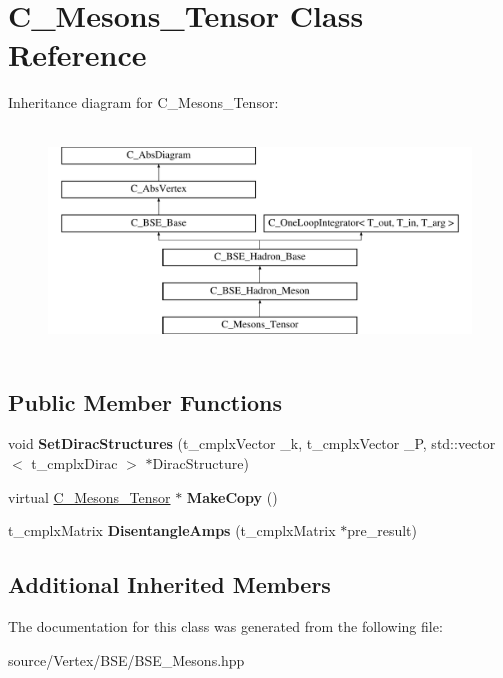 \hypertarget{class_c___mesons___tensor}{\section{C\-\_\-\-Mesons\-\_\-\-Tensor Class Reference}
\label{class_c___mesons___tensor}
}
Inheritance diagram for C\-\_\-\-Mesons\-\_\-\-Tensor\-:\begin{figure}[H]
\begin{center}
\leavevmode
\includegraphics[height=6.000000cm]{class_c___mesons___tensor}
\end{center}
\end{figure}
\subsection*{Public Member Functions}
\begin{DoxyCompactItemize}
\item 
\hypertarget{class_c___mesons___tensor_a04097cb301a1b19622b8dd39f9e3ce0c}{void {\bfseries Set\-Dirac\-Structures} (t\-\_\-cmplx\-Vector \-\_\-k, t\-\_\-cmplx\-Vector \-\_\-\-P, std\-::vector$<$ t\-\_\-cmplx\-Dirac $>$ $\ast$Dirac\-Structure)}\label{class_c___mesons___tensor_a04097cb301a1b19622b8dd39f9e3ce0c}

\item 
\hypertarget{class_c___mesons___tensor_a1710c5be08596588b0a7fcc61d20eb50}{virtual \hyperlink{class_c___mesons___tensor}{C\-\_\-\-Mesons\-\_\-\-Tensor} $\ast$ {\bfseries Make\-Copy} ()}\label{class_c___mesons___tensor_a1710c5be08596588b0a7fcc61d20eb50}

\item 
\hypertarget{class_c___mesons___tensor_a963677c1e4751e6a964a7fd4b7ac1464}{t\-\_\-cmplx\-Matrix {\bfseries Disentangle\-Amps} (t\-\_\-cmplx\-Matrix $\ast$pre\-\_\-result)}\label{class_c___mesons___tensor_a963677c1e4751e6a964a7fd4b7ac1464}

\end{DoxyCompactItemize}
\subsection*{Additional Inherited Members}


The documentation for this class was generated from the following file\-:\begin{DoxyCompactItemize}
\item 
source/\-Vertex/\-B\-S\-E/B\-S\-E\-\_\-\-Mesons.\-hpp\end{DoxyCompactItemize}
